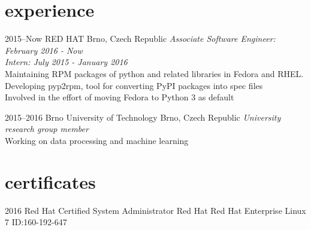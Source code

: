 \documentclass[]{friggeri-cv} %
\begin{document}

\section{experience}


\begin{entrylist}


\entry
{2015--Now}
{RED HAT}
{Brno, Czech Republic}
{\emph{Associate Software Engineer: February 2016 - Now} \\
\emph{Intern: July 2015 - January 2016} \\
Maintaining RPM packages of python and related libraries
in Fedora and RHEL.
\\Developing pyp2rpm, tool for converting PyPI packages into spec files
\\Involved in the effort of moving Fedora to Python 3 as default}


\entry
{2015--2016}
{Brno University of Technology}
{Brno, Czech Republic}
{\emph{University research group member} \\ Working on data processing and machine learning}

\end{entrylist}



\section{certificates}

\begin{entrylist}


\entry
{2016}
{Red Hat Certified System Administrator}
{Red Hat}
{Red Hat Enterprise Linux 7 ID:160-192-647}


\end{entrylist}
\end{document}

